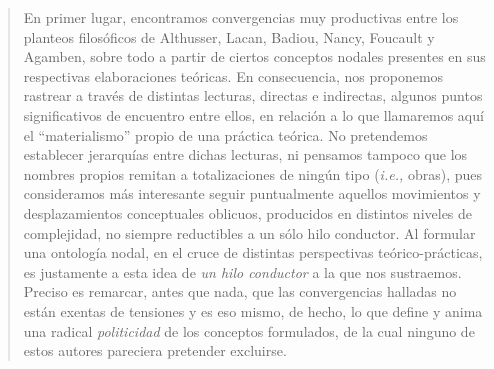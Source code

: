 \begin{quote}
En primer lugar, encontramos convergencias muy productivas entre los planteos filosóficos de Althusser, Lacan, Badiou, Nancy, Foucault y Agamben, sobre todo a partir de ciertos conceptos nodales presentes en sus respectivas elaboraciones teóricas. En consecuencia, nos proponemos rastrear a través de distintas lecturas, directas e indirectas, algunos puntos significativos de encuentro entre ellos, en relación a lo que llamaremos aquí el \enquote{materialismo} propio de una práctica teórica. No pretendemos establecer jerarquías entre dichas lecturas, ni pensamos tampoco que los nombres propios remitan a totalizaciones de ningún tipo (\emph{i.e.,} obras), pues consideramos más interesante seguir puntualmente aquellos movimientos y desplazamientos conceptuales oblicuos, producidos en distintos niveles de complejidad, no siempre reductibles a un sólo hilo conductor. Al formular una ontología nodal, en el cruce de distintas perspectivas teórico-prácticas, es justamente a esta idea de \emph{un hilo conductor} a la que nos sustraemos. Preciso es remarcar, antes que nada, que las convergencias halladas no están exentas de tensiones y es eso mismo, de hecho, lo que define y anima una radical \emph{politicidad} de los conceptos formulados, de la cual ninguno de estos autores pareciera pretender excluirse.


\end{quote}
